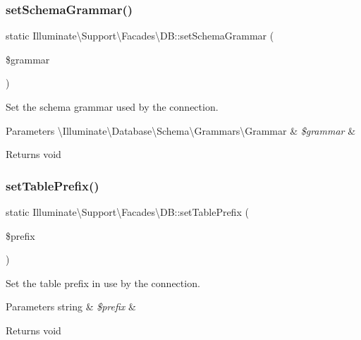 \subsubsection{\texorpdfstring{set\+Schema\+Grammar()}{setSchemaGrammar()}}
{\footnotesize\ttfamily static Illuminate\textbackslash{}\+Support\textbackslash{}\+Facades\textbackslash{}\+D\+B\+::set\+Schema\+Grammar (\begin{DoxyParamCaption}\item[{}]{\$grammar }\end{DoxyParamCaption})\hspace{0.3cm}{\ttfamily [static]}}

Set the schema grammar used by the connection.


\begin{DoxyParams}[1]{Parameters}
\textbackslash{}\+Illuminate\textbackslash{}\+Database\textbackslash{}\+Schema\textbackslash{}\+Grammars\textbackslash{}\+Grammar & {\em \$grammar} & \\
\hline
\end{DoxyParams}
\begin{DoxyReturn}{Returns}
void 
\end{DoxyReturn}
\mbox{\label{class_illuminate_1_1_support_1_1_facades_1_1_d_b_a6eda107e9bd63c513cba9b353d7bfd63}} 
\subsubsection{\texorpdfstring{set\+Table\+Prefix()}{setTablePrefix()}}
{\footnotesize\ttfamily static Illuminate\textbackslash{}\+Support\textbackslash{}\+Facades\textbackslash{}\+D\+B\+::set\+Table\+Prefix (\begin{DoxyParamCaption}\item[{}]{\$prefix }\end{DoxyParamCaption})\hspace{0.3cm}{\ttfamily [static]}}

Set the table prefix in use by the connection.


\begin{DoxyParams}[1]{Parameters}
string & {\em \$prefix} & \\
\hline
\end{DoxyParams}
\begin{DoxyReturn}{Returns}
void 
\end{DoxyReturn}
\mbox{\label{class_illuminate_1_1_support_1_1_facades_1_1_d_b_abe9fe35abfd29aa9bccba94a269c9f25}} 
